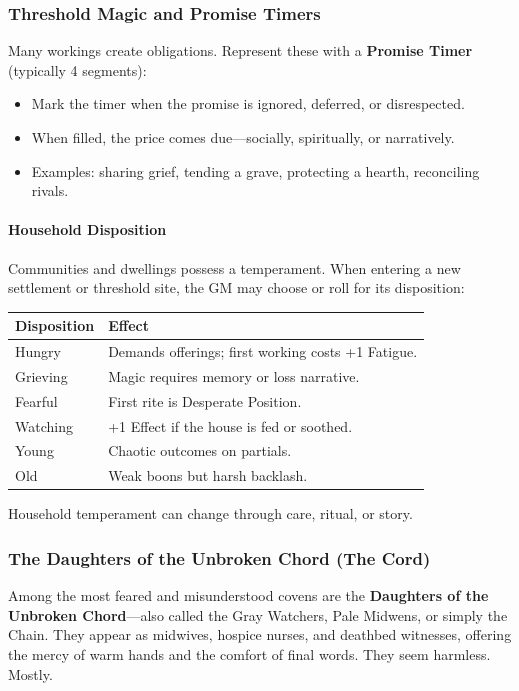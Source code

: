 \subsubsection{Threshold Magic and Promise Timers}

Many workings create obligations. Represent these with a \textbf{Promise Timer } (typically 4 segments):

\begin{itemize}
    \item Mark the timer when the promise is ignored, deferred, or disrespected.
    \item When filled, the price comes due---socially, spiritually, or narratively.
    \item Examples: sharing grief, tending a grave, protecting a hearth, reconciling rivals.
\end{itemize}

\paragraph{Household Disposition}
Communities and dwellings possess a temperament. When entering a new settlement or threshold site, the GM may choose or roll for its disposition:

\begin{center}
\begin{tabular}{|l|l|}
\hline
\textbf{Disposition} & \textbf{Effect} \\
\hline
Hungry & Demands offerings; first working costs +1 Fatigue. \\
Grieving & Magic requires memory or loss narrative. \\
Fearful & First rite is Desperate Position. \\
Watching & +1 Effect if the house is fed or soothed. \\
Young & Chaotic outcomes on partials. \\
Old & Weak boons but harsh backlash. \\
\hline
\end{tabular}
\end{center}

Household temperament can change through care, ritual, or story.

\subsubsection{The Daughters of the Unbroken Chord (The Cord)}

Among the most feared and misunderstood covens are the \textbf{Daughters of the Unbroken Chord}---also called the Gray Watchers, Pale Midwens, or simply the Chain. They appear as midwives, hospice nurses, and deathbed witnesses, offering the mercy of warm hands and the comfort of final words. They seem harmless. Mostly.

